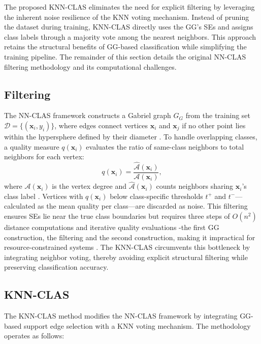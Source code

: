 \documentclass[conference]{IEEEtran}
\begin{document}
The proposed KNN-CLAS eliminates the need for explicit filtering by leveraging the inherent noise resilience of the KNN voting mechanism. Instead of pruning the dataset during training, KNN-CLAS directly uses the GG's SEs and assigns class labels through a majority vote among the nearest neighbors. This approach retains the structural benefits of GG-based classification while simplifying the training pipeline. The remainder of this section details the original NN-CLAS filtering methodology and its computational challenges.

\subsection{Filtering}

The NN-CLAS framework constructs a Gabriel graph \( G_G \) from the training set \( \mathcal{D} = \{(\mathbf{x}_i, y_i)\} \), where edges connect vertices \( \mathbf{x}_i \) and \( \mathbf{x}_j \) if no other point lies within the hypersphere defined by their diameter \cite{torres2016}. To handle overlapping classes, a quality measure \( q(\mathbf{x}_i) \) evaluates the ratio of same-class neighbors to total neighbors for each vertex:
\[
q(\mathbf{x}_i) = \frac{\hat{\mathcal{A}}(\mathbf{x}_i)}{\mathcal{A}(\mathbf{x}_i)},
\]
where \( \mathcal{A}(\mathbf{x}_i) \) is the vertex degree and \( \hat{\mathcal{A}}(\mathbf{x}_i) \) counts neighbors sharing \( \mathbf{x}_i \)'s class label \cite{souza2019}. Vertices with \( q(\mathbf{x}_i) \) below class-specific thresholds \( t^+ \) and \( t^- \)—calculated as the mean quality per class—are discarded as noise. This filtering ensures SEs lie near the true class boundaries but requires three steps of \( O(n^2) \) distance computations and iterative quality evaluations -the first GG construction, the filtering and the second construction, making it impractical for resource-constrained systems \cite{arias2021}. The KNN-CLAS circumvents this bottleneck by integrating neighbor voting, thereby avoiding explicit structural filtering while preserving classification accuracy.

\subsection{KNN-CLAS}
The KNN-CLAS method modifies the NN-CLAS framework by integrating GG-based support edge selection with a KNN voting mechanism. The methodology operates as follows:
\end{document}
